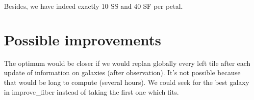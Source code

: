 \documentclass[10pt]{extarticle}
\begin{document}
\begin{multicols}{2}
 Besides, we have indeed exactly 10 SS and 40 SF per petal.

\section{Possible improvements}
The optimum would be closer if we would replan globally every left tile after each update of information on galaxies (after observation). It's not possible because that would be long to compute (several hours).
We could seek for the best galaxy in improve\_fiber instead of taking the first one which fits.
\end{multicols}
\end{document}
